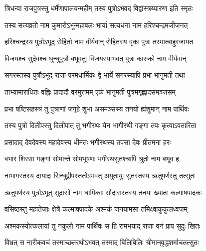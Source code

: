 
\vakta{}
\shrota{}
\translink{}

\storymeta

\twolineshloka
{त्रिधन्वा राजपुत्रस्तु धर्मेणापालयन्महीम्}
{तस्य पुत्रोऽभवद् विद्वांस्त्रय्यारुण इति स्मृतः} %

\twolineshloka
{तस्य सत्यव्रतो नाम कुमारोऽभून्महाबलः}
{भार्या सत्यधना नाम हरिश्चन्द्रमजीजनत्} %

\twolineshloka
{हरिश्चन्द्रस्य पुत्रोऽभूद् रोहितो नाम वीर्यवान्}
{रोहितस्य वृकः पुत्रः तस्मात्बाहुरजायत} %

{विजयश्च सुदेवश्च धुन्धुपुत्रौ बभूवतुः}
{विजयस्याभवत् पुत्रः कारुको नाम वीर्यवान्}

\twolineshloka
{सगरस्तस्य पुत्रौऽभूद् राजा परमधार्मिकः}
{द्वे भार्ये सगरस्यापि प्रभा भानुमती तथा} %

\twolineshloka
{ताभ्यामाराधितः वह्निः प्रादादौ वरमुत्तमम्}
{एकं भानुमती पुत्रमगृह्णादसमञ्जसम्} %

\twolineshloka
{प्रभा षष्टिसहस्त्रं तु पुत्राणां जगृहे शुभा}
{असमञ्सस्य तनयो ह्यंशुमान् नाम पार्थिवः} %

\twolineshloka
{तस्य पुत्रो दिलीपस्तु दिलीपात् तु भगीरथः}
{येन भागीरथी गङ्गा तपः कृत्वाऽवतारिता} %

\twolineshloka
{प्रसादाद् देवदेवस्य महादेवस्य धीमतः}
{भगीरथस्य तपसा देवः प्रीतमना हरः} %

\twolineshloka
{बभार शिरसा गङ्गां सोमान्ते सोमभूषणः}
{भगीरथसुतश्चापि श्रुतो नाम बभूव ह} %

\twolineshloka
{नाभागस्तस्य दायादः सिन्धुद्वीपस्ततोऽभवत्}
{अयुतायुः सुतस्तस्य ऋतुपर्णस्तु तत्सुतः} %

\twolineshloka
{ऋतुपर्णस्य पुत्रोऽभूत् सुदासो नाम धार्मिकाः}
{सौदासस्तस्य तनयः ख्यातः कल्माषपादकः} %

\twolineshloka
{वसिष्ठस्तु महातेजाः क्षेत्रे कल्माषपादके}
{अश्मकं जनयामसा तमिक्ष्वाकुकुलध्वजम्} %

\twolineshloka
{अश्मकस्योत्कलायां तु नकुलो नाम पार्थिवः}
{स हि रामभयाद् राजा वनं प्राप सुदुः खितः} %

\twolineshloka
{विभ्रत् स नारीकवचं तस्माच्छतरथोऽभवत्}
{तस्माद् बिलिबिलिः श्रीमान्‌वृद्धशर्माचतत्सुतः} %

